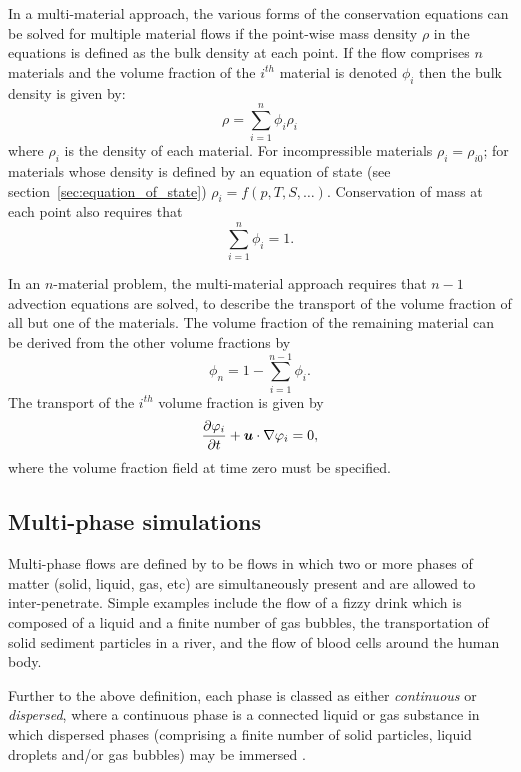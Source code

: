 In a multi-material approach, the various forms of the conservation equations can be solved for multiple material flows if the point-wise mass density $\rho$ in the equations is defined as the bulk density at each point.  If the flow comprises $n$ materials and the volume fraction of the $i^{th}$ material is denoted $\phi_i$ then the bulk density is given by:
\begin{equation}
\rho = \sum_{i=1}^n \phi_i\rho_i
\end{equation}
where $\rho_i$ is the density of each material.  For incompressible materials $\rho_i = \rho_{i0}$; for materials whose density is defined by an equation of state (see section~\ref{sec:equation_of_state}) $\rho_i = f(p,T,S,\ldots)$.  Conservation of mass at each point also requires that
\begin{equation}
\sum_{i=1}^n \phi_{i} = 1.
\end{equation}

In an $n$-material problem, the multi-material approach requires that $n-1$ advection equations are solved, to describe the transport of the volume fraction of all but one of the materials.  The volume fraction of the remaining material can be derived from the other volume fractions by
\begin{equation}\label{diagnosticvolfrac}
\phi_{n} = 1 - \sum_{i=1}^{n-1}\phi_{i}. 
\end{equation}
The transport of the $i^{th}$ volume fraction is given by  
\begin{equation}
\frac{\partial\varphi_i}{\partial t} + {\mbox{\boldmath$u$}}\cdot\nabla\varphi_i = 0,
\end{equation}
where the volume fraction field at time zero must be specified.

\subsection{Multi-phase simulations}
\label{sec:multiphase_equations}
Multi-phase flows are defined by \cite{prosperettiEtAl2007} to be flows in which two or more phases of matter (solid, liquid, gas, etc) are simultaneously present and are allowed to inter-penetrate. Simple examples include the flow of a fizzy drink which is composed of a liquid and a finite number of gas bubbles, the transportation of solid sediment particles in a river, and the flow of blood cells around the human body.

Further to the above definition, each phase is classed as either \textit{continuous} or \textit{dispersed}, where a continuous phase is a connected liquid or gas substance in which dispersed phases (comprising a finite number of solid particles, liquid droplets and/or gas bubbles) may be immersed \citep{croweEtAl1998}.

